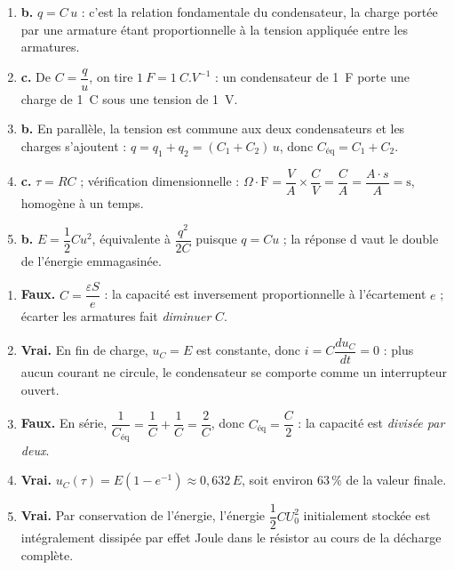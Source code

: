 \documentclass[11pt]{article}
\begin{document}
\begin{corrige}
\begin{enumerate}
\item \textbf{b.} $q = C\,u$ : c'est la relation fondamentale du condensateur, la charge portée par une armature étant proportionnelle à la tension appliquée entre les armatures.
\item \textbf{c.} De $C = \dfrac{q}{u}$, on tire $\SI{1}{F} = \SI{1}{C.V^{-1}}$ : un condensateur de \SI{1}{F} porte une charge de \SI{1}{C} sous une tension de \SI{1}{V}.
\item \textbf{b.} En parallèle, la tension est commune aux deux condensateurs et les charges s'ajoutent : $q = q_1 + q_2 = (C_1 + C_2)\,u$, donc $C_{\text{éq}} = C_1 + C_2$.
\item \textbf{c.} $\tau = RC$ ; vérification dimensionnelle : $\Omega \cdot \mathrm{F} = \dfrac{V}{A}\times\dfrac{C}{V} = \dfrac{C}{A} = \dfrac{A\cdot s}{A} = \mathrm{s}$, homogène à un temps.
\item \textbf{b.} $E = \dfrac{1}{2}Cu^2$, équivalente à $\dfrac{q^2}{2C}$ puisque $q = Cu$ ; la réponse d vaut le double de l'énergie emmagasinée.
\end{enumerate}
\end{corrige}

\begin{corrige}
\begin{enumerate}
\item \textbf{Faux.} $C = \dfrac{\varepsilon S}{e}$ : la capacité est inversement proportionnelle à l'écartement $e$ ; écarter les armatures fait \emph{diminuer} $C$.
\item \textbf{Vrai.} En fin de charge, $u_C = E$ est constante, donc $i = C\dfrac{du_C}{dt} = 0$ : plus aucun courant ne circule, le condensateur se comporte comme un interrupteur ouvert.
\item \textbf{Faux.} En série, $\dfrac{1}{C_{\text{éq}}} = \dfrac{1}{C} + \dfrac{1}{C} = \dfrac{2}{C}$, donc $C_{\text{éq}} = \dfrac{C}{2}$ : la capacité est \emph{divisée par deux}.
\item \textbf{Vrai.} $u_C(\tau) = E(1 - e^{-1}) \approx 0,632\,E$, soit environ $63\,\%$ de la valeur finale.
\item \textbf{Vrai.} Par conservation de l'énergie, l'énergie $\dfrac{1}{2}CU_0^2$ initialement stockée est intégralement dissipée par effet Joule dans le résistor au cours de la décharge complète.
\end{enumerate}
\end{corrige}
\end{document}
